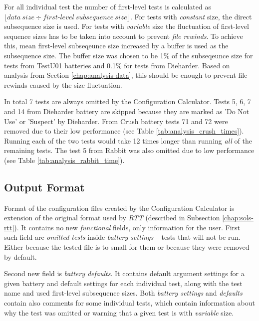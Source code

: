 \documentclass[
  digital,     %
  oneside,     %
  nosansbold,  %
  nocolorbold, %
  nolof,         %
  nolot,         %
]{fithesis4}
\begin{document}
For all individual test the number of first-level tests is calculated as $\lfloor data\:size \div first$-$level\:subsequence\:size\rfloor$. For tests with \emph{constant} size, the direct subsequence size is used. For tests with \emph{variable} size the fluctuation of first-level sequence sizes has to be taken into account to prevent \emph{file rewinds}. To achieve this, mean first-level subseqeunce size increased by a buffer is used as the subsequence size. The buffer size was chosen to be 1\% of the subseqeunce size for tests from TestU01 batteries and 0.1\% for tests from Dieharder. Based on analysis from Section \ref{chap:analysis-data}, this should be enough to prevent file rewinds caused by the size fluctuation.

In total 7 tests are always omitted by the Configuration Calculator. Tests 5, 6, 7 and 14 from Dieharder battery are skipped because they are marked as 'Do Not Use' or 'Suspect' by Dieharder. From Crush battery tests 71 and 72 were removed due to their low performance (see Table \ref{tab:analysis_crush_times}). Running each of the two tests would take 12 times longer than running \emph{all} of the remaining tests. The test 5 from Rabbit was also omitted due to low performance (see Table \ref{tab:analysis_rabbit_time}).


\subsection{Output Format}
Format of the configuration files created by the Configuration Calculator is extension of the original format used by \emph{RTT} (described in Subsection \ref{chap:sols-rtt}). It contains no new \emph{functional} fields, only information for the user. First such field are \emph{omitted tests} inside \emph{battery settings} -- tests that will not be run. Either because the tested file is to small for them or because they were removed by default.

Second new field is \emph{battery defaults}. It contains default argument settings for a given battery and default settings for each individual test, along with the test name and used first-level subsequence sizes. Both \emph{battery settings} and \emph{defaults} contain also comments for some individual tests, which contain information about why the test was omitted or warning that a given test is with \emph{variable} size.
\end{document}
